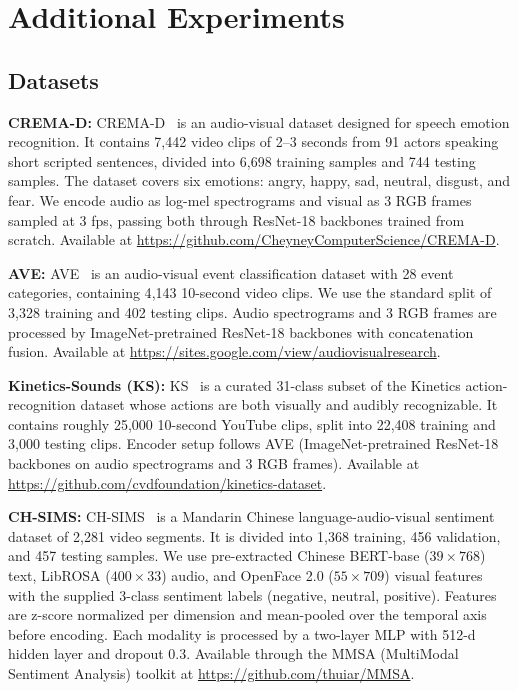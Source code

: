 \documentclass{article}
\begin{document}

\section{Additional Experiments}
\label{app:datasets}

\subsection{Datasets}
\label{app:datasets_list}

\noindent\textbf{CREMA-D:} CREMA-D~\citep{cao2014cremad} is an audio-visual dataset designed for speech emotion recognition. It contains 7{,}442 video clips of 2--3 seconds from 91 actors speaking short scripted sentences, divided into 6{,}698 training samples and 744 testing samples. The dataset covers six emotions: angry, happy, sad, neutral, disgust, and fear. We encode audio as log-mel spectrograms and visual as 3 RGB frames sampled at 3 fps, passing both through ResNet-18 backbones trained from scratch. Available at \url{https://github.com/CheyneyComputerScience/CREMA-D}.

\noindent\textbf{AVE:} AVE~\citep{tian2018ave} is an audio-visual event classification dataset with 28 event categories, containing 4{,}143 10-second video clips. We use the standard split of 3{,}328 training and 402 testing clips. Audio spectrograms and 3 RGB frames are processed by ImageNet-pretrained ResNet-18 backbones with concatenation fusion. Available at \url{https://sites.google.com/view/audiovisualresearch}.

\noindent\textbf{Kinetics-Sounds (KS):} KS~\citep{arandjelovic2017kinetics} is a curated 31-class subset of the Kinetics action-recognition dataset whose actions are both visually and audibly recognizable. It contains roughly 25{,}000 10-second YouTube clips, split into 22{,}408 training and 3{,}000 testing clips. Encoder setup follows AVE (ImageNet-pretrained ResNet-18 backbones on audio spectrograms and 3 RGB frames). Available at \url{https://github.com/cvdfoundation/kinetics-dataset}.

\noindent\textbf{CH-SIMS:} CH-SIMS~\citep{yu2020chsims} is a Mandarin Chinese language-audio-visual sentiment dataset of 2{,}281 video segments. It is divided into 1{,}368 training, 456 validation, and 457 testing samples. We use pre-extracted Chinese BERT-base ($39 \times 768$) text, LibROSA ($400 \times 33$) audio, and OpenFace 2.0 ($55 \times 709$) visual features with the supplied 3-class sentiment labels (negative, neutral, positive). Features are z-score normalized per dimension and mean-pooled over the temporal axis before encoding. Each modality is processed by a two-layer MLP with 512-d hidden layer and dropout $0.3$. Available through the MMSA (MultiModal Sentiment Analysis) toolkit at \url{https://github.com/thuiar/MMSA}.
\end{document}
